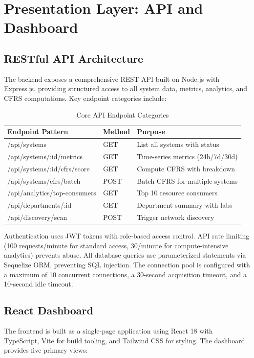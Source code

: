 \documentclass{ieeeaccess}
\begin{document}
\section{Presentation Layer: API and Dashboard}
\label{sec:frontend}

\subsection{RESTful API Architecture}
The backend exposes a comprehensive REST API built on Node.js with Express.js, providing structured access to all system data, metrics, analytics, and CFRS computations. Key endpoint categories include:

\begin{table}[h]
\centering
\caption{Core API Endpoint Categories}
\label{tab:api_endpoints}
\footnotesize
\begin{tabular}{p{3.5cm} l p{3cm}}
\hline
\textbf{Endpoint Pattern} & \textbf{Method} & \textbf{Purpose} \\
\hline
/api/systems & GET & List all systems with status \\
/api/systems/:id/metrics & GET & Time-series metrics (24h/7d/30d) \\
/api/systems/:id/cfrs/score & GET & Compute CFRS with breakdown \\
/api/systems/cfrs/batch & POST & Batch CFRS for multiple systems \\
/api/analytics/top-consumers & GET & Top 10 resource consumers \\
/api/departments/:id & GET & Department summary with labs \\
/api/discovery/scan & POST & Trigger network discovery \\
\hline
\end{tabular}
\end{table}

Authentication uses JWT tokens with role-based access control. API rate limiting (100 requests/minute for standard access, 30/minute for compute-intensive analytics) prevents abuse. All database queries use parameterized statements via Sequelize ORM, preventing SQL injection. The connection pool is configured with a maximum of 10 concurrent connections, a 30-second acquisition timeout, and a 10-second idle timeout.

\subsection{React Dashboard}
The frontend is built as a single-page application using React 18 with TypeScript, Vite for build tooling, and Tailwind CSS for styling. The dashboard provides five primary views:
\end{document}
